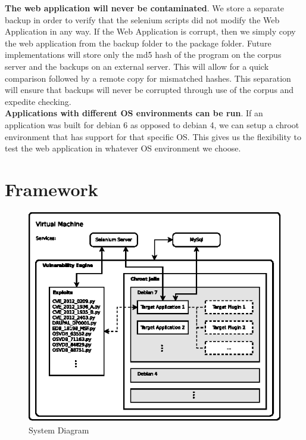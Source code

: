 \documentclass[letterpaper,twocolumn,10pt]{article}
\begin{document}
{\bf The web application will never be contaminated}.  We store a separate backup in order to verify that the selenium scripts did not modify the Web Application in any way.  If the Web Application is corrupt, then we simply copy the web application from the backup folder to the package folder.  Future implementations will store only the md5 hash of the program on the corpus server and the backups on an external server.  This will allow for a quick comparison followed by a remote copy for mismatched hashes.  This separation will ensure that backups will never be corrupted through use of the corpus and expedite checking.  \\

{\bf Applications with different OS environments can be run}.  If an application was built for debian 6 as opposed to debian 4, we can setup a chroot environment that has support for that specific OS.  This gives us the flexibility to test the web application in whatever OS environment we choose.\\

\section{Framework}

\begin{figure}[!tp]
\begin{center}
\includegraphics[scale=1.17]{system_diagram.eps}
\end{center}
\caption{System Diagram}
\end{figure}
\end{document}
